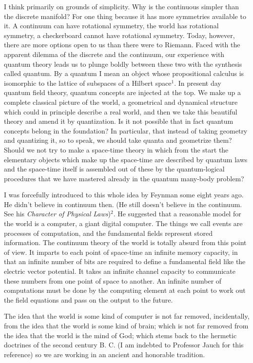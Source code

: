 I think primarily on grounds of simplicity. Why is the continuous simpler than
the discrete manifold? For one thing because it has more symmetries available to
it. A continuum can have rotational symmetry, the world has rotational symmetry,
a checkerboard cannot have rotational symmetry. Today, however, there are more
options open to us than there were to Riemann. Faced with the apparent dilemma of
the discrete and the continuum, our experience with quantum theory leads us to
plunge boldly between these two with the synthesis called quantum. By a quantum I
mean an object whose propositional calculus is isomorphic to the lattice of
subspaces of a Hilbert space$^1$. In present day quantum field theory, quantum
concepts are injected at the top. We make up a complete classical picture of the
world, a geometrical and dynamical structure which could in principle describe a
real world, and then we take this beautiful theory and amend it by quantization.
Is it not possible that in fact quantum concepts belong in the foundation? In
particular, that instead of taking geometry and quantizing it, so to speak, we
should take quanta and geometrize them? Should we not try to make a space-time
theory in which from the start the elementary objects which make up the
space-time are described by quantum laws and the space-time itself is assembled
out of these by the quantum-logical procedures that we have mastered already in
the quantum many-body problem?

I was forcefully introduced to this whole idea by Feynman some eight years ago.
He didn't believe in continuum then. (He still doesn't believe in the continuum.
See his {\em Character of Physical Laws})$^2$. He suggested that a reasonable
model for the world is a computer, a giant digital computer. The things we call
events are processes of computation, and the fundamental fields represent stored
information. The continuum theory of the world is totally absurd from this point
of view. It imparts to each point of space-time an infinite memory capacity, in
that an infinite number of bits are required to define a fundamental field like
the electric vector potential. It takes an infinite channel capacity to
communicate these numbers from one point of space to another. An infinite number
of computations must be done by the computing element at each point to work out
the field equations and pass on the output to the future.

The idea that the world is some kind of computer is not far removed,
incidentally, from the idea that the world is some kind of brain; which is not
far removed from the idea that the world is the mind of God; which stems back to
the hermetic doctrines of the second century B. C. (I am indebted to Professor
Jauch for this reference) so we are working in an ancient and honorable
tradition.

